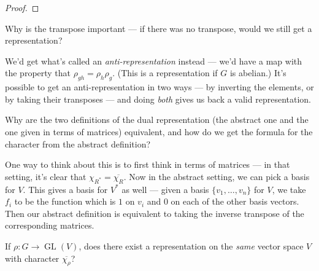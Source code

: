 \begin{proof}
    

\end{proof}

\begin{question}
 Why is the transpose important --- if there was no transpose, would we still get a representation?
\end{question}

\begin{ans}
We'd get what's called an \emph{anti-representation} instead --- we'd have a map with the property that $\rho_{gh} = \rho_h\rho_g$. (This is a representation if $G$ is abelian.) It's possible to get an anti-representation in two ways --- by inverting the elements, or by taking their transposes --- and doing \emph{both} gives us back a valid representation. 
\end{ans}

\begin{question}
Why are the two definitions of the dual representation (the abstract one and the one given in terms of matrices) equivalent, and how do we get the formula for the character from the abstract definition?
\end{question}

\begin{ans}
One way to think about this is to first think in terms of matrices --- in that setting, it's clear that $\chi_{R^*} = \overline{\chi_R}$. Now in the abstract setting, we can pick a basis for $V$. This gives a basis for $V^*$ as well --- given a basis $\{v_1, \ldots, v_n\}$ for $V$, we take $f_i$ to be the function which is $1$ on $v_i$ and $0$ on each of the other basis vectors. Then our abstract definition is equivalent to taking the inverse transpose of the corresponding matrices. 
\end{ans}

\begin{question}
If $\rho : G \to \operatorname{GL}(V)$, does there exist a representation on the \emph{same} vector space $V$ with character $\overline{\chi_\rho}$?
\end{question}

